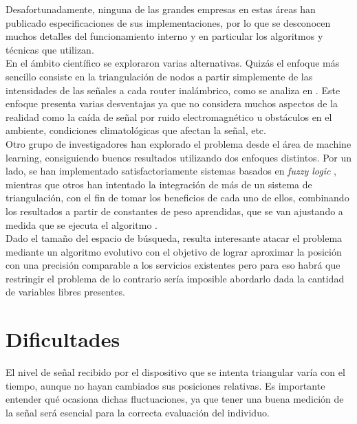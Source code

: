 \documentclass[journal]{IEEEtran}
\begin{document}
Desafortunadamente, ninguna de las grandes empresas en estas áreas han publicado especificaciones de sus implementaciones, por lo que se desconocen muchos detalles del funcionamiento interno y en particular los algoritmos y técnicas que utilizan.\\

En el ámbito científico se exploraron varias alternativas. Quizás el enfoque más sencillo consiste en la triangulación de nodos a partir simplemente de las intensidades de las señales a cada router inalámbrico, como se analiza en \cite{simple:triangulation}. Este enfoque presenta varias desventajas ya que no considera muchos aspectos de la realidad como la caída de señal por ruido electromagnético u obstáculos en el ambiente, condiciones climatológicas que afectan la señal, etc.\\

Otro grupo de investigadores han explorado el problema desde el área de machine learning, consiguiendo buenos resultados utilizando dos enfoques distintos. Por un lado, se han implementado satisfactoriamente sistemas basados en \textit{fuzzy logic} \cite{fuzzy:logic:based:system}, mientras que otros han intentado la integración de más de un sistema de triangulación, con el fin de tomar los beneficios de cada uno de ellos, combinando los resultados a partir de constantes de peso aprendidas, que se van ajustando a medida que se ejecuta el algoritmo \cite{adaptive:weighting}.\\

Dado el tamaño del espacio de búsqueda, resulta interesante atacar el problema mediante un algoritmo evolutivo con el objetivo de lograr aproximar la posición con una precisión comparable a los servicios existentes pero para eso habrá que restringir el problema de lo contrario sería imposible abordarlo dada la cantidad de variables libres presentes.\\

\section{Dificultades}

El nivel de señal recibido por el dispositivo que se intenta triangular varía con el tiempo, aunque no hayan cambiados sus posiciones relativas. Es importante entender qué ocasiona dichas fluctuaciones, ya que tener una buena medición de la señal será esencial para la correcta evaluación del individuo.\\
\end{document}
